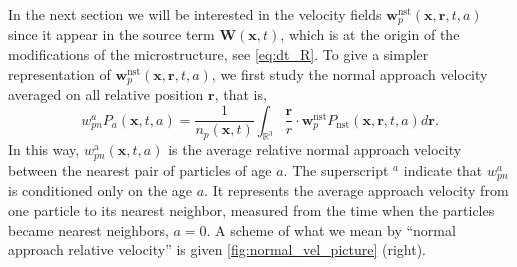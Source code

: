 In the next section we will be interested in the velocity fields $\textbf{w}_p^\text{nst}(\textbf{x},\textbf{r},t,a)$ since it appear in the source term $\textbf{W}(\textbf{x},t)$, which is at the origin of the modifications of the microstructure, see \ref{eq:dt_R}. 
To give a simpler representation of $\textbf{w}_p^\text{nst}(\textbf{x},\textbf{r},t,a)$, we first study the normal approach velocity averaged on all relative position $\textbf{r}$, that is,  
\begin{equation*}
    w_{pn}^aP_a(\textbf{x},t,a)
    = \frac{1}{n_p(\textbf{x},t)}
    \int_{\mathbb{R}^3}
    \frac{\textbf{r}}{r} \cdot \textbf{w}^\text{nst}_p
    P_\text{nst}(\textbf{x},\textbf{r},t,a) d\textbf{r}.
\end{equation*}
In this way, $w^\text{a}_{pn}(\textbf{x},t,a)$ is the average relative normal approach velocity between the nearest pair of particles of age $a$. 
The superscript $^a$ indicate that $w_{pn}^a$ is conditioned only on the age $a$. 
It represents the average approach velocity from one particle to its nearest neighbor, measured from the time when the particles became nearest neighbors, $a=0$.
A scheme of what we mean by ``normal approach relative velocity'' is given \ref{fig:normal_vel_picture} (right). 
